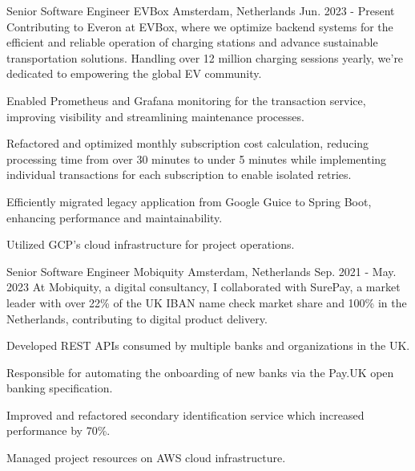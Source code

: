 

\begin{cventries}
  \cventry
  {Senior Software Engineer} %
  {EVBox} %
  {Amsterdam, Netherlands} %
  {Jun. 2023 - Present} %
  {
    Contributing to Everon at EVBox, where we optimize backend systems for the efficient and reliable operation of charging stations and advance sustainable transportation solutions. Handling over 12 million charging sessions yearly, we're dedicated to empowering the global EV community.
  }
  {
    \begin{cvitems} %
      \item {Enabled Prometheus and Grafana monitoring for the transaction service, improving visibility and streamlining maintenance processes.}
      \item {Refactored and optimized monthly subscription cost calculation, reducing processing time from over 30 minutes to under 5 minutes while implementing individual transactions for each subscription to enable isolated retries.}
      \item {Efficiently migrated legacy application from Google Guice to Spring Boot, enhancing performance and maintainability.}
      \item {Utilized GCP's cloud infrastructure for project operations.}
    \end{cvitems}
  }

  \cventry
    {Senior Software Engineer} %
    {Mobiquity} %
    {Amsterdam, Netherlands} %
    {Sep. 2021 - May. 2023} %
    {
      At Mobiquity, a digital consultancy, I collaborated with SurePay, a market leader with over 22\% of the UK IBAN name check market share and 100\% in the Netherlands, contributing to digital product delivery.
    }
    {
      \begin{cvitems} %
        \item {Developed REST APIs consumed by multiple banks and organizations in the UK.}
        \item {Responsible for automating the onboarding of new banks via the Pay.UK open banking specification.}
        \item {Improved and refactored secondary identification service which increased performance by 70\%.}
        \item {Managed project resources on AWS cloud infrastructure.}
      \end{cvitems}
    }


\end{cventries}
